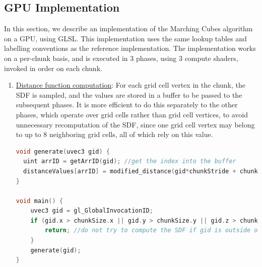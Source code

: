 \documentclass{article}
\begin{document}
\subsection{GPU Implementation}
\label{section:mc_gpu}
In this section, we describe an implementation of the Marching Cubes algorithm on a GPU, using GLSL. This implementation uses the same lookup tables and labelling conventions as the reference implementation\cite{bourke_1994}. The implementation works on a per-chunk basis, and is executed in 3 phases, using 3 compute shaders, invoked in order on each chunk. 
\begin{enumerate}

\item \underline{Distance function computation}: For each grid cell vertex in the chunk, the SDF is sampled, and the values are stored in a buffer to be passed to the subsequent phases. It is more efficient to do this separately to the other phases, which operate over grid cells rather than grid cell vertices, to avoid unnecessary recomputation of the SDF, since one grid cell vertex may belong to up to 8 neighboring grid cells, all of which rely on this value.
\begin{lstlisting}[language=C++,label={mc_generate},caption={GLSL code for generating the SDF at one vertex in a chunk. The function \texttt{generate} calls the SDF \texttt{modified\_distance}, and stores the value in a buffer.}]
void generate(uvec3 gid) {
  uint arrID = getArrID(gid); //get the index into the buffer
  distanceValues[arrID] = modified_distance(gid*chunkStride + chunkPosition); //call the SDF at the corresponding world-space location
}

void main() {
	uvec3 gid = gl_GlobalInvocationID;
	if (gid.x > chunkSize.x || gid.y > chunkSize.y || gid.z > chunkSize.z) {
		return; //do not try to compute the SDF if gid is outside of the volume
	}
	generate(gid);
}
\end{lstlisting}


\end{enumerate}
\end{document}

